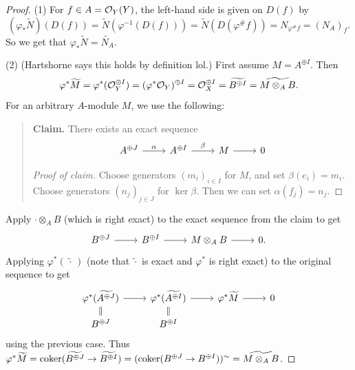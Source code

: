 \begin{proof}
  (1) For $f \in A = \mathcal{O}_Y(Y)$,
  the left-hand side is given on $D(f)$
  by
  \[
    (\varphi_* \widetilde{N})(D(f))
    = \widetilde{N}(\varphi^{-1}(D(f)))
    = \widetilde{N}(D(\varphi^\# f))
    = N_{\varphi^\# f}
    = (N_A)_f.
  \]
  So we get that
  $\varphi_* \widetilde{N} = \widetilde{N_A}$.

  (2) (Hartshorne says this holds
  by definition lol.)
  First assume $M = A^{\oplus I}$. Then
  \[
    \varphi^* \widetilde{M}
    = \varphi^*(\mathcal{O}_Y^{\oplus I})
    = (\varphi^* \mathcal{O}_Y)^{\oplus I}
    = \mathcal{O}_X^{\oplus I}
    = \widetilde{B^{\oplus I}}
    = \widetilde{M \otimes_A B}.
  \]
  For an arbitrary $A$-module $M$,
  we use the following:
  \begin{quote}
    \textbf{Claim.} There exists an
    exact sequence
    \[
      \begin{tikzcd}
        A^{\oplus J} \ar[r, "\alpha"]
        & A^{\oplus I} \ar[r, "\beta"]
        & M \ar[r]
        & 0
      \end{tikzcd}
    \]

    \begin{proof}[Proof of claim]
      Choose generators $(m_i)_{i \in I}$ for
      $M$, and set
      $\beta(e_i) = m_i$. Choose
      generators $(n_j)_{j \in J}$
      for $\ker \beta$. Then we can set
      $\alpha(f_j) = n_j$.
    \end{proof}
  \end{quote}
  Apply $\cdot \otimes_A B$ (which is
  right exact)
  to the
  exact sequence from the claim to
  get
  \[
    \begin{tikzcd}
      B^{\oplus J} \ar[r]
      & B^{\oplus I} \ar[r]
      & M \otimes_A B \ar[r]
      & 0.
    \end{tikzcd}
  \]
  Applying $\varphi^* (\, \widetilde{\cdot}\,)$
  (note that $\widetilde{\cdot}$
  is exact and $\varphi^*$ is right exact)
  to the original sequence to get
  \[
    \begin{tikzcd}[row sep=small]
      \varphi^*(\widetilde{A^{\oplus J}}) \ar[r]
      & \varphi^*(\widetilde{A^{\oplus I}}) \ar[r]
      & \varphi^* \widetilde{M} \ar[r]
      & 0 \\
      B^{\oplus J} \ar[u, equal]
      & B^{\oplus I} \ar[u, equal]
    \end{tikzcd}
  \]
  using the previous case.
  Thus $\varphi^* \widetilde{M} = \operatorname{coker}(\widetilde{B^{\oplus J}} \to \widetilde{B^{\oplus I}}) = (\operatorname{coker}(B^{\oplus J} \to B^{\oplus I}))^{\sim} = \widetilde{M \otimes_A B}$.
\end{proof}


